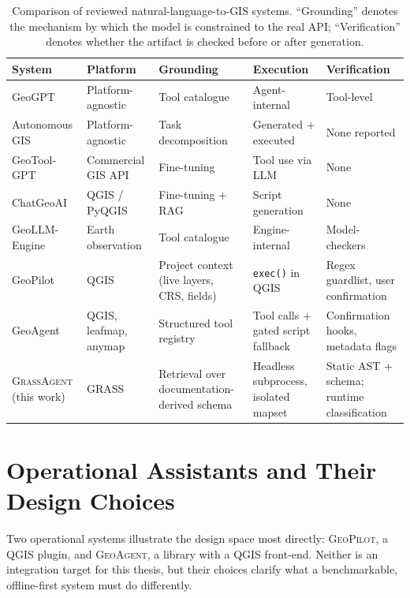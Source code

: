 \begin{table}[htbp]
\centering
\caption{Comparison of reviewed natural-language-to-GIS systems. ``Grounding''
denotes the mechanism by which the model is constrained to the real API;
``Verification'' denotes whether the artifact is checked before or after
generation.}
\label{tab:related}
\small
\begin{tabular}{p{2.6cm} p{1.9cm} p{3.1cm} p{2.4cm} p{2.6cm}}
\toprule
\textbf{System} & \textbf{Platform} & \textbf{Grounding} & \textbf{Execution} &
\textbf{Verification} \\
\midrule
GeoGPT \cite{zhang2023geogpt} & Platform-agnostic & Tool catalogue & Agent-internal &
Tool-level \\
Autonomous GIS \cite{li2023autonomousgis} & Platform-agnostic & Task decomposition
& Generated + executed & None reported \\
GeoTool-GPT \cite{wei2024geotoolgpt} & Commercial GIS API & Fine-tuning & Tool use
via LLM & None \\
ChatGeoAI \cite{mansourian2024chatgeoai} & QGIS / PyQGIS & Fine-tuning + RAG
& Script generation & None \\
GeoLLM-Engine \cite{singh2024geollmengine} & Earth observation & Tool catalogue
& Engine-internal & Model-checkers \\
GeoPilot & QGIS & Project context (live layers, CRS, fields) &
\texttt{exec()} in QGIS & Regex guardlist, user confirmation \\
GeoAgent & QGIS, leafmap, anymap & Structured tool registry & Tool calls +
gated script fallback & Confirmation hooks, metadata flags \\
\midrule
\textsc{GrassAgent} (this work) & GRASS & Retrieval over
documentation-derived schema & Headless subprocess, isolated mapset & Static
AST + schema; runtime classification \\
\bottomrule
\end{tabular}
\end{table}

\section{Operational Assistants and Their Design Choices}
\label{sec:bg:assistants}

Two operational systems illustrate the design space most directly:
\textsc{GeoPilot}, a QGIS plugin, and \textsc{GeoAgent}, a library with a QGIS
front-end. Neither is an integration target for this thesis, but their choices
clarify what a benchmarkable, offline-first system must do differently.

